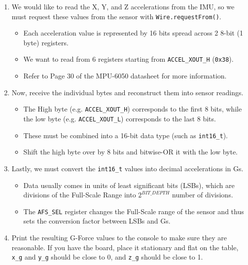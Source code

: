 \documentclass{article}
\begin{document}
        \begin{enumerate}
            \item We would like to read the X, Y, and Z accelerations from the IMU, so we must request these values from the sensor with \texttt{Wire.requestFrom()}.
            \begin{itemize}
                \item Each acceleration value is represented by 16 bits spread across 2 8-bit (1 byte) registers.
                \item We want to read from 6 registers starting from \texttt{ACCEL\_XOUT\_H} (\texttt{0x38}).
                \item Refer to Page 30 of the MPU-6050 datasheet for more information.
            \end{itemize}
            \item Now, receive the individual bytes and reconstruct them into sensor readings.
            \begin{itemize}
                \item The High byte (e.g. \texttt{ACCEL\_XOUT\_H}) corresponds to the first 8 bits, while the low byte (e.g. \texttt{ACCEL\_XOUT\_L}) corresponds to the last 8 bits.
                \item These must be combined into a 16-bit data type (such as \texttt{int16\_t}).
                \item Shift the high byte over by 8 bits and bitwise-OR it with the low byte.
            \end{itemize}
            \item Lastly, we must convert the \texttt{int16\_t} values into decimal accelerations in Gs.
            \begin{itemize}
                \item Data usually comes in units of least significant bits (LSBs), which are divisions of the Full-Scale Range into $2^{BIT\_DEPTH}$ number of divisions.
                \item The \texttt{AFS\_SEL} register changes the Full-Scale range of the sensor and thus sets the conversion factor between LSBs and Gs.
            \end{itemize}
            \item Print the resulting G-Force values to the console to make sure they are reasonable. If you have the board, place it stationary and flat on the table, \texttt{x\_g} and \texttt{y\_g} should be close to 0, and \texttt{z\_g} should be close to 1.
        \end{enumerate}
        
\end{document}
